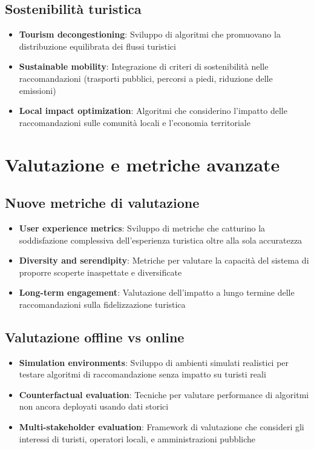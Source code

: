 \subsection{Sostenibilità turistica}
\begin{itemize}
\item \textbf{Tourism decongestioning}: Sviluppo di algoritmi che promuovano la distribuzione equilibrata dei flussi turistici
\item \textbf{Sustainable mobility}: Integrazione di criteri di sostenibilità nelle raccomandazioni (trasporti pubblici, percorsi a piedi, riduzione delle emissioni)
\item \textbf{Local impact optimization}: Algoritmi che considerino l'impatto delle raccomandazioni sulle comunità locali e l'economia territoriale
\end{itemize}

\section{Valutazione e metriche avanzate}

\subsection{Nuove metriche di valutazione}
\begin{itemize}
\item \textbf{User experience metrics}: Sviluppo di metriche che catturino la soddisfazione complessiva dell'esperienza turistica oltre alla sola accuratezza
\item \textbf{Diversity and serendipity}: Metriche per valutare la capacità del sistema di proporre scoperte inaspettate e diversificate
\item \textbf{Long-term engagement}: Valutazione dell'impatto a lungo termine delle raccomandazioni sulla fidelizzazione turistica
\end{itemize}

\subsection{Valutazione offline vs online}
\begin{itemize}
\item \textbf{Simulation environments}: Sviluppo di ambienti simulati realistici per testare algoritmi di raccomandazione senza impatto su turisti reali
\item \textbf{Counterfactual evaluation}: Tecniche per valutare performance di algoritmi non ancora deployati usando dati storici
\item \textbf{Multi-stakeholder evaluation}: Framework di valutazione che consideri gli interessi di turisti, operatori locali, e amministrazioni pubbliche
\end{itemize}

